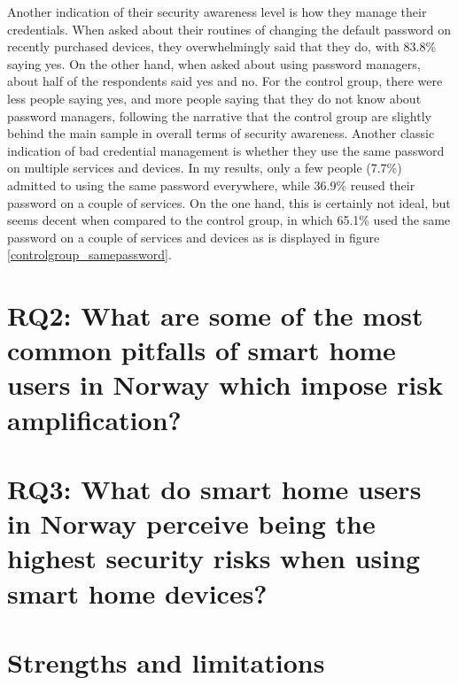 Another indication of their security awareness level is how they manage their credentials. When asked about their routines of changing the default password on recently purchased devices, they overwhelmingly said that they do, with 83.8\% saying yes. On the other hand, when asked about using password managers, about half of the respondents said yes and no. For the control group, there were less people saying yes, and more people saying that they do not know about password managers, following the narrative that the control group are slightly behind the main sample in overall terms of security awareness. Another classic indication of bad credential management is whether they use the same password on multiple services and devices. In my results, only a few people (7.7\%) admitted to using the same password everywhere, while 36.9\% reused their password on a couple of services. On the one hand, this is certainly not ideal, but seems decent when compared to the control group, in which 65.1\% used the same password on a couple of services and devices as is displayed in figure \ref{controlgroup_samepassword}.

\section{RQ2: What are some of the most common pitfalls of smart home users in Norway which impose risk amplification?}

\section{RQ3: What do smart home users in Norway perceive being the highest security risks when using smart home devices?}


\section{Strengths and limitations}


\begin{comment}
Råd:
1. Begynn drøftingen med å repetere problemstillingen. Referer deretter de viktigste funnene fra teorikapitlet.
2. Skill tydelig mellom andres syn og ditt eget. Bruk helst vi-form når du fremmer egne synspunkter, referatmarkører når du refererer kildene.
3. Marker at du diskuterer ved å bruke uttrykk som "På den ene siden ... på den andre siden", "mot dette kan det hevdes at", "noen hevder ... andre sier tvert imot at".
4. Sørg for å gjøre klart hvilke kriterier du vurderer ut fra.
5. La drøftingen ta utgangspunkt i en hypotese, det vil si en påstand du vil undersøke nærmere. 
6. Tenk deg drøftingen som en pro-et-contra-oversikt med argumenter for (pro) på den ene siden av arket og argumenter imot (contra) på den andre siden. 
7. Husk å lage en overgang til konklusjonen ved å spørre deg selv følgende spørsmål: "Hvilke(n) konklusjon(er) kan trekkes av denne drøftingen".
\end{comment}